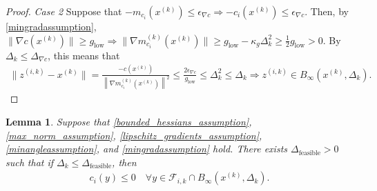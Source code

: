 \documentclass{article}
\newtheorem{lemma}[theorem]{Lemma}
\theoremstyle{case}
\numberwithin{theorem}{subsection}
\newcommand{\dfeas}{{\Delta_{\textrm{feasible}}}}
\newcommand{\dk}{\Delta_k}
\newcommand{\fik}{{\mathcal F_{i, k}}}
\newcommand{\gmcik}{{\nabla m_{c_i}^{(k)}\left(\xk\right)}}
\newcommand{\mingraddelta}{{\Delta_{\nabla c}}}
\newcommand{\mingradepsilon}{{\epsilon_{\nabla c}}}
\newcommand{\mingrad}{{ g_{\textrm{low}} }}
\newcommand{\tr}{{ B_{\infty}\left(\xk, \dk\right) }}
\newcommand{\xk}{{x^{(k)}}}
\newcommand{\zik}{{z^{(i, k)}}}
\begin{document}
\begin{proof}
\emph{Case 2}
Suppose that $-m_{c_i}(\xk) \le \mingradepsilon \Longrightarrow -c_i(\xk) \le \mingradepsilon$.
Then, by \cref{mingradassumption}, $\|\nabla c(\xk) \| \ge \mingrad \Longrightarrow \|\gmcik\| \ge \mingrad - \kappa_g \dk^2 \ge \frac 1 2 \mingrad > 0$.
By $\dk \le \mingraddelta$, this means that 
\begin{align*}
\|\zik-\xk\| = \frac{-c(\xk)}{\left\|\gmcik\right\|^2} \le \frac{2\mingradepsilon}{\mingrad}\le \dk^2 \le \dk \Longrightarrow \zik \in \tr.
\end{align*}
\end{proof}




\begin{lemma}
\label{each_constraints_cone_is_feasible}
Suppose that 
\cref{bounded_hessians_assumption},
\cref{max_norm_assumption},
\cref{lipschitz_gradients_assumption},
\cref{minangleassumption},
and \cref{mingradassumption} hold.
There exists $\dfeas > 0$ such that
if $\dk \le \dfeas$, then
\begin{align*}
c_i(y) \le 0 \quad \forall y \in \fik \cap \tr.
\end{align*}
\end{lemma}
\end{document}
